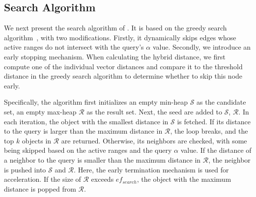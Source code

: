 
\subsection{Search Algorithm}
\label{sec:search}
We next present the search algorithm of \method. It is based on the greedy search algorithm~\cite{wang2021comprehensive}, with two modifications. Firstly, it dynamically skips edges whose active ranges do not intersect with the query's $\alpha$ value. Secondly, we introduce an early stopping mechanism. When calculating the hybrid distance, we first compute one of the individual vector distances and compare it to the threshold distance in the greedy search algorithm to determine whether to skip this node early.

Specifically, the algorithm first initializes an empty min-heap $\mathcal{S}$ as the candidate set, an empty max-heap $\mathcal{R}$ as the result set. Next, the seed are added to $\mathcal{S}$, $\mathcal{R}$. In each iteration, the object with the smallest distance in $\mathcal{S}$ is fetched. If its distance to the query is larger than the maximum distance in $\mathcal{R}$, the loop breaks, and the top $k$ objects in $\mathcal{R}$ are returned. Otherwise, its neighbors are checked, with some being skipped based on the active ranges and the query $\alpha$ value. If the distance of a neighbor to the query is smaller than the maximum distance in $\mathcal{R}$, the neighbor is pushed into $\mathcal{S}$ and $\mathcal{R}$. Here, the early termination mechanism is used for acceleration. If the size of $\mathcal{R}$ exceeds $ef_{search}$, the object with the maximum distance is popped from $\mathcal{R}$.

